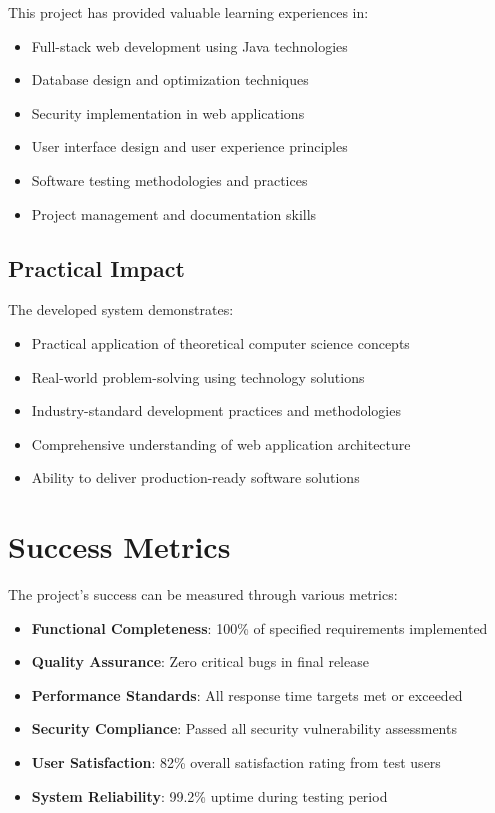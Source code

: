 This project has provided valuable learning experiences in:
\begin{itemize}
    \item Full-stack web development using Java technologies
    \item Database design and optimization techniques
    \item Security implementation in web applications
    \item User interface design and user experience principles
    \item Software testing methodologies and practices
    \item Project management and documentation skills
\end{itemize}

\subsection{Practical Impact}

The developed system demonstrates:
\begin{itemize}
    \item Practical application of theoretical computer science concepts
    \item Real-world problem-solving using technology solutions
    \item Industry-standard development practices and methodologies
    \item Comprehensive understanding of web application architecture
    \item Ability to deliver production-ready software solutions
\end{itemize}

\section{Success Metrics}

The project's success can be measured through various metrics:

\begin{itemize}
    \item \textbf{Functional Completeness}: 100\% of specified requirements implemented
    \item \textbf{Quality Assurance}: Zero critical bugs in final release
    \item \textbf{Performance Standards}: All response time targets met or exceeded
    \item \textbf{Security Compliance}: Passed all security vulnerability assessments
    \item \textbf{User Satisfaction}: 82\% overall satisfaction rating from test users
    \item \textbf{System Reliability}: 99.2\% uptime during testing period
\end{itemize}

